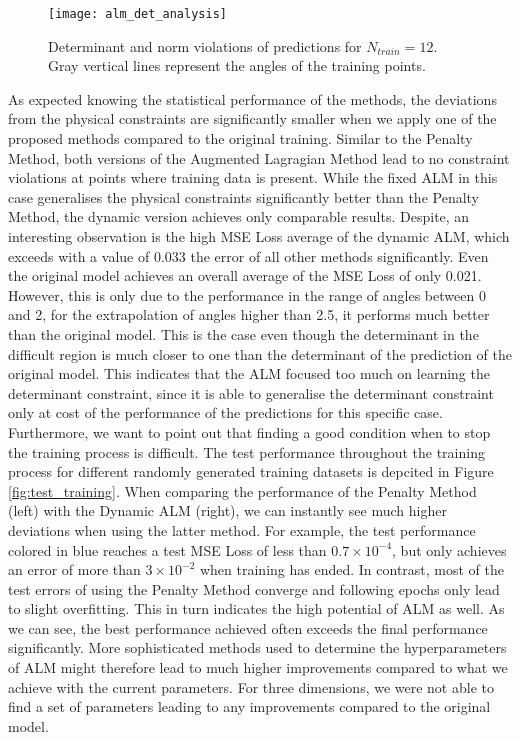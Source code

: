 \begin{figure}[H]
	\texttt{[image: alm\_det\_analysis]}
	\caption{Determinant and norm violations of predictions for $N_{train} = 12$. Gray vertical lines represent the angles of the training points.}
	\label{fig:alm_det_analysis}
\end{figure}

As expected knowing the statistical performance of the methods, the deviations from the physical constraints are significantly smaller when we apply one of the proposed methods compared to the original training. Similar to the Penalty Method, both versions of the Augmented Lagragian Method lead to no constraint violations at points where training data is present. While the fixed ALM in this case generalises the physical constraints significantly better than the Penalty Method, the dynamic version achieves only comparable results. Despite, an interesting observation is the high MSE Loss average of the dynamic ALM, which exceeds with a value of 0.033 the error of all other methods significantly. Even the original model achieves an overall average of the MSE Loss of only 0.021. However, this is only due to the performance in the range of angles between 0 and 2, for the extrapolation of angles higher than 2.5, it performs much better than the original model. This is the case even though the determinant in the difficult region is much closer to one than the determinant of the prediction of the original model. This indicates that the ALM focused too much on learning the determinant constraint, since it is able to generalise the determinant constraint only at cost of the performance of the predictions for this specific case.\\
\indent Furthermore, we want to point out that finding a good condition when to stop the training process is difficult. The test performance throughout the training process for different randomly generated training datasets is depcited in Figure \ref{fig:test_training}. When comparing the performance of the Penalty Method (left) with the Dynamic ALM (right), we can instantly see much higher deviations when using the latter method. For example, the test performance colored in blue reaches a test MSE Loss of less than $0.7\times 10^{-4}$, but only achieves an error of more than $3\times 10^{-2}$ when training has ended. In contrast, most of the test errors of using the Penalty Method converge and following epochs only lead to slight overfitting. This in turn indicates the high potential of ALM as well. As we can see, the best performance achieved often exceeds the final performance significantly. More sophisticated methods used to determine the hyperparameters of ALM  might therefore lead to much higher improvements compared to what we achieve with the current parameters. For three dimensions, we were not able to find a set of parameters leading to any improvements compared to the original model.
